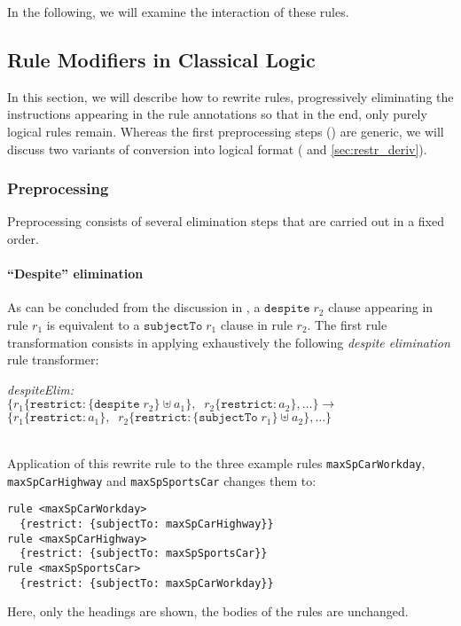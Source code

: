 In the following, we will examine the interaction of these rules.

\subsection{Rule Modifiers in Classical Logic}\label{sec:rule_modifiers_in_classical_logic}

In this section, we will describe how to rewrite rules, progressively
eliminating the instructions appearing in the rule annotations so that in the
end, only purely logical rules remain. Whereas the first preprocessing steps
() are generic, we will discuss two variants of
conversion into logical format ( and
\ref{sec:restr_deriv}).



\subsubsection{Preprocessing}\label{sec:preprocessing}

Preprocessing consists of several elimination steps that are carried out in a
fixed order.

\paragraph{\textbf{``Despite''  elimination}}

As can be concluded from the discussion in , a
$\mathtt{despite}\; r_2$ clause appearing in rule $r_1$ is equivalent to a
$\mathtt{subjectTo}\; r_1$ clause in rule $r_2$. The first rule transformation
consists in applying exhaustively the following \emph{despite elimination}
rule transformer:

\noindent
\emph{despiteElim:}\\
$
\{r_1 \{\mathtt{restrict}: \{\mathtt{despite}\; r_2\} \uplus a_1\},\;\;
r_2\{\mathtt{restrict}: a_2\}, \dots\} \longrightarrow$\\
$\{r_1 \{\mathtt{restrict}: a_1\},\;\;
r_2\{\mathtt{restrict}:  \{\mathtt{subjectTo}\; r_1\} \uplus a_2\}, \dots\}
$

\begin{example}\label{ex:rewrite_despite}\mbox{}\\
Application of this rewrite rule to the three example rules \texttt{maxSpCarWorkday},
\texttt{maxSpCarHighway} and  \texttt{maxSpSportsCar} changes them to:

\begin{lstlisting}
rule <maxSpCarWorkday>
  {restrict: {subjectTo: maxSpCarHighway}}
rule <maxSpCarHighway>
  {restrict: {subjectTo: maxSpSportsCar}}
rule <maxSpSportsCar>
  {restrict: {subjectTo: maxSpCarWorkday}}
\end{lstlisting}
Here, only the headings are shown, the bodies of the rules are
unchanged. 
\end{example}

